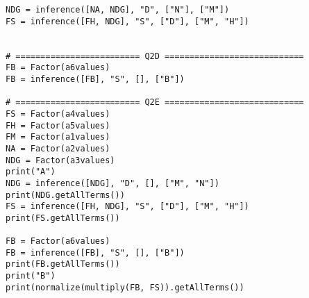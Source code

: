 \documentclass{article}
\begin{document}
\begin{titlepage}
\begin{lstlisting}
NDG = inference([NA, NDG], "D", ["N"], ["M"])
FS = inference([FH, NDG], "S", ["D"], ["M", "H"])


# ========================= Q2D ============================
FB = Factor(a6values)
FB = inference([FB], "S", [], ["B"])

# ========================= Q2E ============================
FS = Factor(a4values)
FH = Factor(a5values)
FM = Factor(a1values)
NA = Factor(a2values)
NDG = Factor(a3values)
print("A")
NDG = inference([NDG], "D", [], ["M", "N"])
print(NDG.getAllTerms())
FS = inference([FH, NDG], "S", ["D"], ["M", "H"])
print(FS.getAllTerms())

FB = Factor(a6values)
FB = inference([FB], "S", [], ["B"])
print(FB.getAllTerms())
print("B")
print(normalize(multiply(FB, FS)).getAllTerms())
\end{lstlisting}
\end{titlepage}
\end{document}

